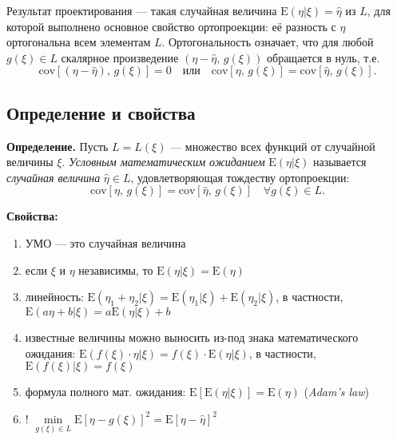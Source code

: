 \documentclass[11pt,a4paper]{article}
\providecommand{\tightlist}{%
      \setlength{\itemsep}{0pt}\setlength{\parskip}{0pt}}
\begin{document}
    \begin{center}
    \end{center}

    Результат проектирования --- такая случайная величина
\(\mathrm{E}(\eta|\xi) = \hat{\eta}\) из \(L\), для которой выполнено
основное свойство ортопроекции: её разность с \(\eta\) ортогональна всем
элементам \(L\). Ортогональность означает, что для любой
\(g(\xi) \in L\) скалярное произведение
\((\eta - \hat{\eta},\, g(\xi))\) обращается в нуль, т.е. \[
  \mathrm{cov}\left[(\eta - \hat{\eta}),\, g(\xi) \right] = 0 \quad \mathrm{или} \quad \mathrm{cov}\left[ \eta,\, g(\xi) \right] = \mathrm{cov}\left[ \hat{\eta},\, g(\xi) \right].
\]

    \hypertarget{ux43eux43fux440ux435ux434ux435ux43bux435ux43dux438ux435-ux438-ux441ux432ux43eux439ux441ux442ux432ux430}{%
\subsection{Определение и
свойства}\label{ux43eux43fux440ux435ux434ux435ux43bux435ux43dux438ux435-ux438-ux441ux432ux43eux439ux441ux442ux432ux430}}

\textbf{Определение.} Пусть \(L = L(\xi)\) --- множество всех функций от
случайной величины \(\xi\). \emph{Условным математическим ожиданием}
\(\mathrm{E}(\eta|\xi)\) называется \emph{случайная величина}
\(\hat{\eta} \in L\), удовлетворяющая тождеству ортопроекции: \[
  \mathrm{cov}\left[ \eta,\, g(\xi) \right] = \mathrm{cov}\left[ \hat{\eta},\, g(\xi) \right] \quad \forall g(\xi) \in L.  
\]

    \textbf{Свойства:}

\begin{enumerate}
\def\labelenumi{\arabic{enumi}.}
\tightlist
\item
  УМО --- это случайная величина
\item
  если \(\xi\) и \(\eta\) независимы, то
  \(\mathrm{E}(\eta|\xi) = \mathrm{E}(\eta)\)
\item
  линейность:
  \(\mathrm{E}(\eta_1 + \eta_2|\xi) = \mathrm{E}(\eta_1|\xi) + \mathrm{E}(\eta_2|\xi)\),
  в частности, \(\mathrm{E}(a\eta + b|\xi) = a\mathrm{E}(\eta|\xi) + b\)
\item
  известные величины можно выносить из-под знака математического
  ожидания:
  \(\mathrm{E}(f(\xi) \cdot \eta|\xi) = f(\xi) \cdot \mathrm{E}(\eta|\xi)\),
  в частности, \(\mathrm{E}(f(\xi)|\xi) = f(\xi)\)
\item
  формула полного мат. ожидания:
  \(\mathrm{E}\left[ \mathrm{E}(\eta|\xi) \right] = \mathrm{E}(\eta)\)
  (\emph{Adam's law})
\item
  !
  \(\min\limits_{g(\xi) \in L} \mathrm{E}[\eta - g(\xi)]^2 = \mathrm{E}[\eta - \hat{\eta}]^2\)
\end{enumerate}
\end{document}

